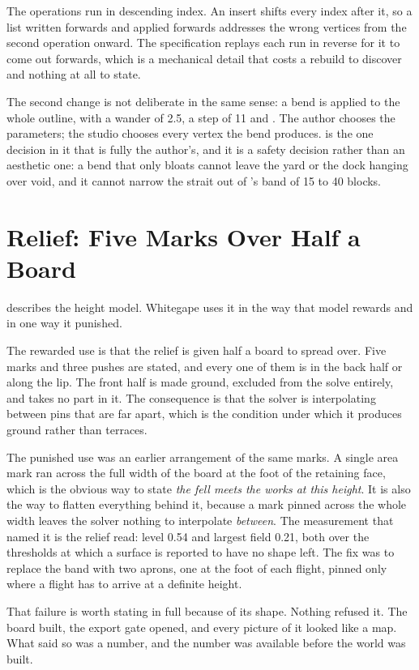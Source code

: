 The operations run in descending index. An insert shifts every index after it,
so a list written forwards and applied forwards addresses the wrong vertices
from the second operation onward. The specification replays each run in reverse
for it to come out forwards, which is a mechanical detail that costs a rebuild
to discover and nothing at all to state.

The second change is not deliberate in the same sense: a bend is applied to the
whole outline, with a wander of 2.5, a step of 11 and . The
author chooses the parameters; the studio chooses every vertex the bend
produces.  is the one decision in it that is fully the author's,
and it is a safety decision rather than an aesthetic one: a bend that only
bloats cannot leave the yard or the dock hanging over void, and it cannot
narrow the strait out of 's band of 15 to 40 blocks.

\section{Relief: Five Marks Over Half a Board}

 describes the height model. Whitegape uses it in the way that
model rewards and in one way it punished.

The rewarded use is that the relief is given half a board to spread over. Five
marks and three pushes are stated, and every one of them is in the back half or
along the lip. The front half is made ground, excluded from the solve entirely,
and takes no part in it. The consequence is that the solver is interpolating
between pins that are far apart, which is the condition under which it produces
ground rather than terraces.

The punished use was an earlier arrangement of the same marks. A single area
mark ran across the full width of the board at the foot of the retaining face,
which is the obvious way to state \emph{the fell meets the works at this
height}. It is also the way to flatten everything behind it, because a mark
pinned across the whole width leaves the solver nothing to interpolate
\emph{between}. The measurement that named it is the relief read: level 0.54
and largest field 0.21, both over the thresholds at which a surface is reported
to have no shape left. The fix was to replace the band with two aprons, one at
the foot of each flight, pinned only where a flight has to arrive at a definite
height.

That failure is worth stating in full because of its shape. Nothing refused it.
The board built, the export gate opened, and every picture of it looked like a
map. What said so was a number, and the number was available before the world
was built.

